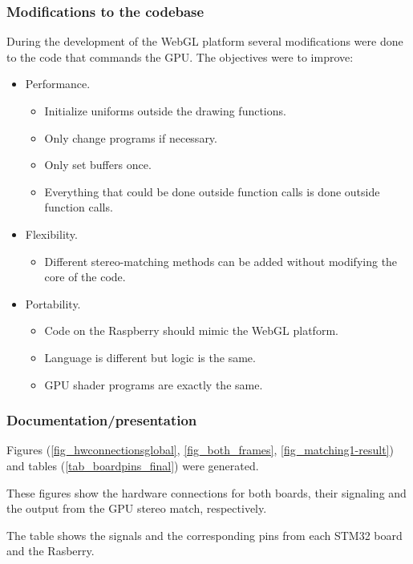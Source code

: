\subsubsection{Modifications to the codebase}

During the development of the WebGL platform several modifications were done to the code that commands the GPU. The objectives were to improve:
\begin{itemize}
	\item Performance.
	\begin{itemize}
		\item Initialize uniforms outside the drawing functions.
		\item Only change programs if necessary.
		\item Only set buffers once.
		\item Everything that could be done outside function calls is done outside function calls.
	\end{itemize}
	\item Flexibility.
	\begin{itemize}
		\item Different stereo-matching methods can be added without modifying the core of the code.
	\end{itemize}
	\item Portability.
	\begin{itemize}
		\item Code on the Raspberry should mimic the WebGL platform.
		\item Language is different but logic is the same.
		\item GPU shader programs are exactly the same.
	\end{itemize}
\end{itemize}

\subsubsection{Documentation/presentation}
Figures (\ref{fig_hwconnectionsglobal}, \ref{fig_both_frames}, \ref{fig_matching1-result}) and tables (\ref{tab_boardpins_final}) were generated.

These figures show the hardware connections for both boards, their signaling and the output from the GPU stereo match, respectively.

The table shows the signals and the corresponding pins from each STM32 board and the Rasberry.

